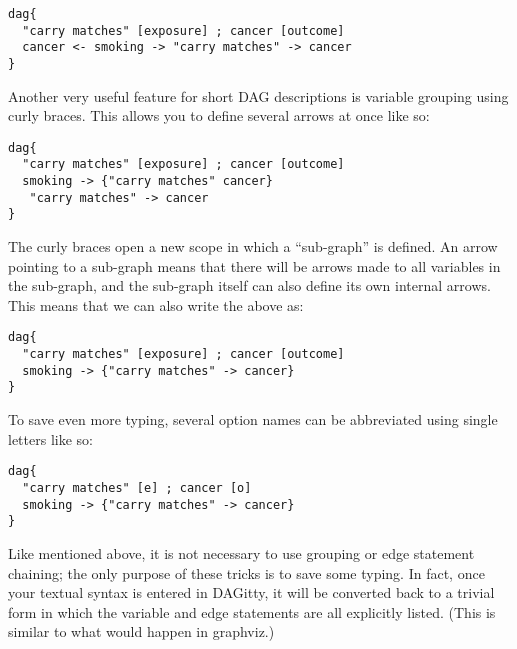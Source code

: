 \documentclass[a4paper]{article} %
\makeatletter
\newcommand{\pp}{{\sc DAG}itty\xspace}
\newenvironment{kframe}{%
 \def\at@end@of@kframe{}%
 \ifinner\ifhmode%
  \def\at@end@of@kframe{\end{minipage}}%
  \begin{minipage}{\columnwidth}%
 \fi\fi%
 \def\FrameCommand##1{\hskip\@totalleftmargin \hskip-\fboxsep
 \colorbox{shadecolor}{##1}\hskip-\fboxsep
     \hskip-\linewidth \hskip-\@totalleftmargin \hskip\columnwidth}%
 \MakeFramed {\advance\hsize-\width
   \@totalleftmargin\z@ \linewidth\hsize
   \@setminipage}}%
 {\par\unskip\endMakeFramed%
 \at@end@of@kframe}
\makeatother
\begin{document}
\begin{kframe}
\begin{verbatim}
dag{ 
  "carry matches" [exposure] ; cancer [outcome]
  cancer <- smoking -> "carry matches" -> cancer 
}
\end{verbatim}
\end{kframe}

Another very useful feature for short DAG descriptions is variable grouping using curly braces. This allows you to define several arrows at once like so:
\begin{kframe}
\begin{verbatim}
dag{
  "carry matches" [exposure] ; cancer [outcome]
  smoking -> {"carry matches" cancer}
   "carry matches" -> cancer
}
\end{verbatim}
\end{kframe}

The curly braces open a new scope in which a ``sub-graph'' is defined. An arrow pointing to a sub-graph means that there will be arrows made to all variables in the sub-graph, and the sub-graph itself can also define its own internal arrows. This means that we can also write the above as:
\begin{kframe}
\begin{verbatim}
dag{
  "carry matches" [exposure] ; cancer [outcome]
  smoking -> {"carry matches" -> cancer}
}
\end{verbatim}
\end{kframe}

To save even more typing, several option names can be abbreviated using single letters like so:
\begin{kframe}
\begin{verbatim}
dag{
  "carry matches" [e] ; cancer [o]
  smoking -> {"carry matches" -> cancer}
}
\end{verbatim}
\end{kframe}

Like mentioned above, it is not necessary to use grouping or edge statement chaining; the only purpose of these tricks is to save some typing. In fact, once your textual syntax is entered in \pp, it will be converted back to a trivial form in which the variable and edge statements are all explicitly listed. (This is similar to what would happen in graphviz.)
\end{document}
